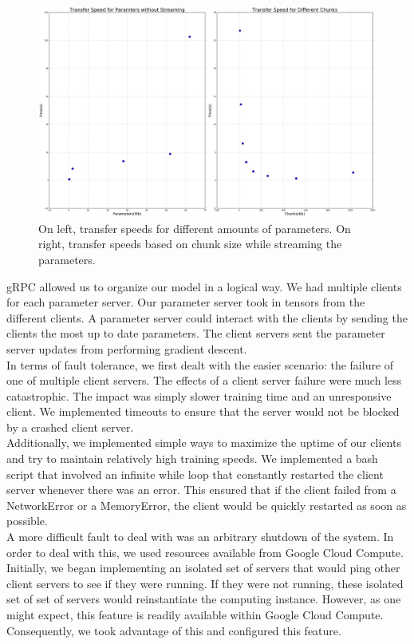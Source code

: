 \documentclass[11pt]{article}
\begin{document}
\begin{figure}[!ht]
  \centering
      \includegraphics[scale = .2]{./images/speeds.png}
  \caption{On left, transfer speeds for different amounts of parameters. On right, transfer speeds based on chunk size while streaming the parameters.}
  \label{fig:local}
\end{figure}


\noindent gRPC allowed us to organize our model in a logical way. We had multiple clients for each parameter server. Our parameter server took in tensors from the different clients. A parameter server could interact with the clients by sending the clients the most up to date parameters. The client servers sent the parameter server updates from performing gradient descent. \\

\noindent In terms of fault tolerance, we first dealt with the easier scenario: the failure of one of multiple client servers. The effects of a client server failure were much less catastrophic. The impact was simply slower training time and an unresponsive client. We implemented timeouts to ensure that the server would not be blocked by a crashed client server. \\

\noindent Additionally, we implemented simple ways to maximize the uptime of our clients and try to maintain relatively high training speeds. We implemented a bash script that involved an infinite while loop that constantly restarted the client server whenever there was an error. This ensured that if the client failed from a NetworkError or a MemoryError, the client would be quickly restarted as soon as possible.\\

\noindent A more difficult fault to deal with was an arbitrary shutdown of the system. In order to deal with this, we used resources available from Google Cloud Compute. Initially, we began implementing an isolated set of servers that would ping other client servers to see if they were running. If they were not running, these isolated set of set of servers would reinstantiate the computing instance. However, as one might expect, this feature is readily available within Google Cloud Compute. Consequently, we took advantage of this and configured this feature. \\
\end{document}
